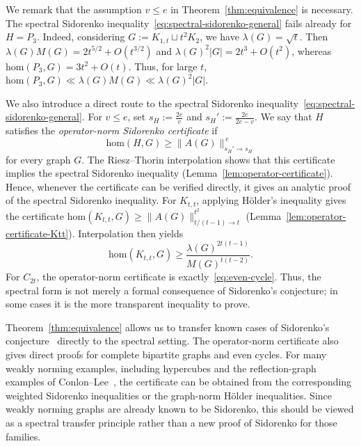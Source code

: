 \documentclass[11pt]{article}
\theoremstyle{definition}
\theoremstyle{plain}
\newcommand{\homc}{\mathrm{hom}}
\begin{document}
We remark that the assumption \(v\le e\) in Theorem~\ref{thm:equivalence} is necessary.
The spectral Sidorenko inequality~\eqref{eq:spectral-sidorenko-general} fails already for \(H=P_3\). Indeed, considering $G:=K_{1,t}\sqcup t^2 K_2$, we have $\lambda (G)=\sqrt{t}$. Then $\lambda(G)M(G)=2t^{5/2}+O(t^{3/2})$ and 
$\lambda(G)^2|G|=2t^3+ O(t^2)$, whereas 
$\homc(P_3,G)=3t^2+O(t)$. Thus, for large \(t\), \(\homc(P_3,G)\ll \lambda(G)M(G) \ll \lambda(G)^2|G| \). 




We also introduce a direct route to the spectral Sidorenko inequality~\eqref{eq:spectral-sidorenko-general}.  For \(v\le e\), set $s_H:=\frac{2e}{v}$ and $s_H':=\frac{2e}{2e-v}$.
We say that \(H\) satisfies the \emph{operator-norm Sidorenko
certificate} if
\[
        \homc(H,G)\ge \|A(G)\|_{s_H'\to s_H}^{\,e}
\]
for every graph \(G\).  The Riesz--Thorin interpolation shows that this
certificate implies the spectral Sidorenko inequality (Lemma~\ref{lem:operator-certificate}).  Hence, whenever the certificate can be verified directly, it gives an
analytic proof of the spectral Sidorenko inequality. For \(K_{t,t}\), applying H\"older's inequality gives the certificate 
$        \homc(K_{t,t},G)\ge \|A(G)\|_{t/(t-1)\to t}^{t^2}$ (Lemma~\ref{lem:operator-certificate-Ktt}). Interpolation then yields
\begin{equation}
\label{eq:Ktt}
        \homc(K_{t,t},G)
        \ge
        \frac{\lambda(G)^{2t(t-1)}}{M(G)^{t(t-2)}}.
\end{equation}
For $C_{2t}$, the operator-norm certificate is exactly~\eqref{eq:even-cycle}. Thus, the spectral form is not merely a formal consequence of Sidorenko's conjecture; in some cases it is the more transparent inequality to prove.


Theorem~\ref{thm:equivalence} allows us to transfer known cases of Sidorenko's conjecture~\cite{Sidorenko1993CorrelationInequality, ConlonFoxSudakov2010, Hatami2010, KimLeeLee2016, ConlonLee2017, ConlonKimLeeLee2018} directly to the spectral setting.  The operator-norm certificate also gives direct proofs for
complete bipartite graphs and even cycles.  For many weakly norming examples, including hypercubes and the
reflection-graph examples of Conlon--Lee~\cite{ConlonLee2017}, the
certificate can be obtained from the corresponding weighted Sidorenko inequalities or
the graph-norm H\"older inequalities.  Since weakly norming graphs are
already known to be Sidorenko, this should be viewed as a spectral
transfer principle rather than a new proof of Sidorenko for those
families.
\end{document}
